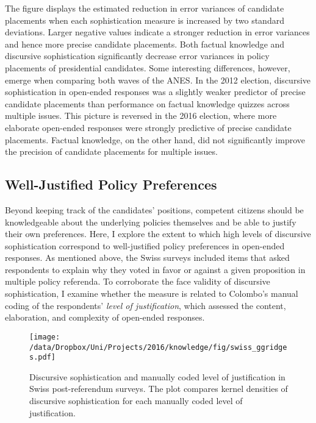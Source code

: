 The figure displays the estimated reduction in error variances of candidate placements when each sophistication measure is increased by two standard deviations. Larger negative values indicate a stronger reduction in error variances and hence more precise candidate placements. Both factual knowledge and discursive sophistication significantly decrease error variances in policy placements of presidential candidates. Some interesting differences, however, emerge when comparing both waves of the ANES. In the 2012 election, discursive sophistication in open-ended responses was a slightly weaker predictor of precise candidate placements than performance on factual knowledge quizzes across multiple issues. This picture is reversed in the 2016 election, where more elaborate open-ended responses were strongly predictive of precise candidate placements. Factual knowledge, on the other hand, did not significantly improve the precision of candidate placements for multiple issues.


\subsection{Well-Justified Policy Preferences}
Beyond keeping track of the candidates' positions, competent citizens should be knowledgeable about the underlying policies themselves and be able to justify their own preferences. Here, I explore the extent to which high levels of discursive sophistication correspond to well-justified policy preferences in open-ended responses. As mentioned above, the Swiss surveys included items that asked respondents to explain why they voted in favor or against a given proposition in multiple policy referenda. To corroborate the face validity of discursive sophistication, I examine whether the measure is related to Colombo's \citeyearpar{colombo2016justifications} manual coding of the respondents' \textit{level of justification}, which assessed the content, elaboration, and complexity of open-ended responses.

\begin{figure}[h]\centering
\texttt{[image: /data/Dropbox/Uni/Projects/2016/knowledge/fig/swiss\_ggridges.pdf]}
\caption{Discursive sophistication and manually coded level of justification \citep{colombo2016justifications} in Swiss post-referendum surveys. The plot compares kernel densities of discursive sophistication for each manually coded level of justification.}\label{fig:swiss_ggridges}
\end{figure}

